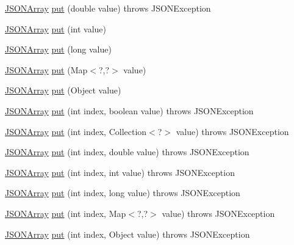 \begin{DoxyCompactItemize}
\hyperlink{classorg_1_1json_1_1JSONArray}{J\-S\-O\-N\-Array} \hyperlink{classorg_1_1json_1_1JSONArray_a0640a8fabd23294c4972a7884b1e3714}{put} (double value)  throws J\-S\-O\-N\-Exception 
\item 
\hyperlink{classorg_1_1json_1_1JSONArray}{J\-S\-O\-N\-Array} \hyperlink{classorg_1_1json_1_1JSONArray_a86a8ba6ff68f50faaad5c7070ef91f64}{put} (int value)
\item 
\hyperlink{classorg_1_1json_1_1JSONArray}{J\-S\-O\-N\-Array} \hyperlink{classorg_1_1json_1_1JSONArray_a3dd194b7438a41505fe1ff4cee0cd3fd}{put} (long value)
\item 
\hyperlink{classorg_1_1json_1_1JSONArray}{J\-S\-O\-N\-Array} \hyperlink{classorg_1_1json_1_1JSONArray_ab03fe6cb26c02a1223849055bf824150}{put} (Map$<$?,?$>$ value)
\item 
\hyperlink{classorg_1_1json_1_1JSONArray}{J\-S\-O\-N\-Array} \hyperlink{classorg_1_1json_1_1JSONArray_a184c04f20d200b83da5f70c05651949c}{put} (Object value)
\item 
\hyperlink{classorg_1_1json_1_1JSONArray}{J\-S\-O\-N\-Array} \hyperlink{classorg_1_1json_1_1JSONArray_a40deb37f82b54a44476a6a162ba55864}{put} (int index, boolean value)  throws J\-S\-O\-N\-Exception 
\item 
\hyperlink{classorg_1_1json_1_1JSONArray}{J\-S\-O\-N\-Array} \hyperlink{classorg_1_1json_1_1JSONArray_a34ac3c9f6aa2f4d5bd2a47ff2ef65149}{put} (int index, Collection$<$?$>$ value)  throws J\-S\-O\-N\-Exception 
\item 
\hyperlink{classorg_1_1json_1_1JSONArray}{J\-S\-O\-N\-Array} \hyperlink{classorg_1_1json_1_1JSONArray_a44381e6efca784b131ff8d384f41447a}{put} (int index, double value)  throws J\-S\-O\-N\-Exception 
\item 
\hyperlink{classorg_1_1json_1_1JSONArray}{J\-S\-O\-N\-Array} \hyperlink{classorg_1_1json_1_1JSONArray_a2283abbc9a0e52077d0cce1a3ed8cd39}{put} (int index, int value)  throws J\-S\-O\-N\-Exception 
\item 
\hyperlink{classorg_1_1json_1_1JSONArray}{J\-S\-O\-N\-Array} \hyperlink{classorg_1_1json_1_1JSONArray_a8e84855241ff2c9af58f47043273956c}{put} (int index, long value)  throws J\-S\-O\-N\-Exception 
\item 
\hyperlink{classorg_1_1json_1_1JSONArray}{J\-S\-O\-N\-Array} \hyperlink{classorg_1_1json_1_1JSONArray_aea74e48046d2ebed46ea9499165b53ba}{put} (int index, Map$<$?,?$>$ value)  throws J\-S\-O\-N\-Exception 
\item 
\hyperlink{classorg_1_1json_1_1JSONArray}{J\-S\-O\-N\-Array} \hyperlink{classorg_1_1json_1_1JSONArray_a5e2cb4652c3cfec3f955edd32e9aaf87}{put} (int index, Object value)  throws J\-S\-O\-N\-Exception 

\end{DoxyCompactItemize}
